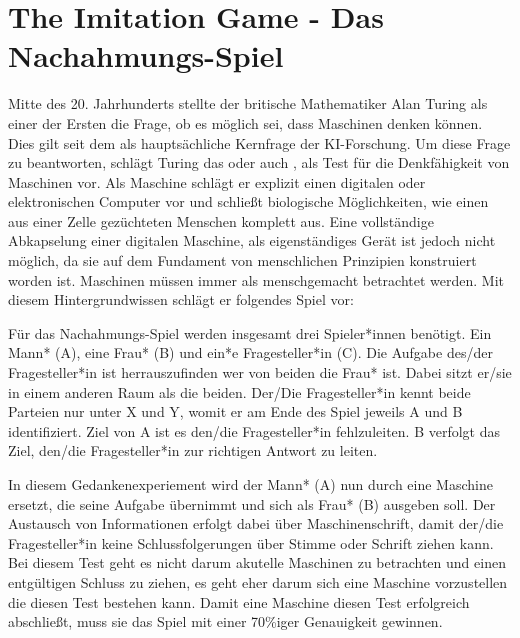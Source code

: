 \documentclass[12pt,german,ngerman]{report}
\begin{document}
    \section{The Imitation Game - Das Nachahmungs-Spiel}
        Mitte des 20. Jahrhunderts stellte der britische Mathematiker Alan Turing als einer der Ersten
        die Frage, ob es möglich sei, dass Maschinen denken können. Dies gilt seit dem als hauptsächliche
        Kernfrage der KI-Forschung. Um diese Frage zu beantworten, schlägt Turing das  oder
        auch , als Test für die Denkfähigkeit von Maschinen vor. Als Maschine schlägt er
        explizit einen digitalen oder elektronischen Computer vor und schließt biologische Möglichkeiten,
        wie einen aus einer Zelle gezüchteten Menschen komplett aus.\cite[435]{turing1950computing}
        Eine vollständige Abkapselung einer digitalen Maschine, als eigenständiges Gerät ist jedoch nicht möglich, da sie auf dem
        Fundament von menschlichen Prinzipien konstruiert worden ist. Maschinen müssen immer als menschgemacht betrachtet werden.
        Mit diesem Hintergrundwissen schlägt er folgendes Spiel vor:
        \begin{displayquote}
            Für das Nachahmungs-Spiel werden insgesamt drei Spieler*innen benötigt. Ein Mann* (A), eine Frau* (B) und ein*e
            Fragesteller*in (C). Die Aufgabe des/der Fragesteller*in ist herrauszufinden wer von beiden die Frau* ist.
            Dabei sitzt er/sie in einem anderen Raum als die beiden. Der/Die Fragesteller*in kennt beide Parteien
            nur unter X und Y, womit er am Ende des Spiel jeweils A und B identifiziert. Ziel von A ist es den/die Fragesteller*in
            fehlzuleiten. B verfolgt das Ziel, den/die Fragesteller*in zur richtigen Antwort zu leiten.
            \cite[433]{turing1950computing}
        \end{displayquote}
        In diesem Gedankenexperiement wird der Mann* (A) nun durch eine Maschine ersetzt, die seine Aufgabe übernimmt und
        sich als Frau* (B) ausgeben soll. Der Austausch von Informationen erfolgt dabei über Maschinenschrift, damit
        der/die Fragesteller*in keine Schlussfolgerungen über Stimme oder Schrift ziehen kann.\cite[433]{turing1950computing}
        Bei diesem Test geht es nicht darum akutelle Maschinen zu betrachten und einen entgültigen Schluss zu ziehen, es geht
        eher darum sich eine Maschine vorzustellen die diesen Test bestehen kann.
        Damit eine Maschine diesen Test erfolgreich abschließt,
        muss sie das Spiel mit einer 70\%iger Genauigkeit gewinnen.\cite[1]{oppy&dowe2020turingtest}
        
\end{document}
